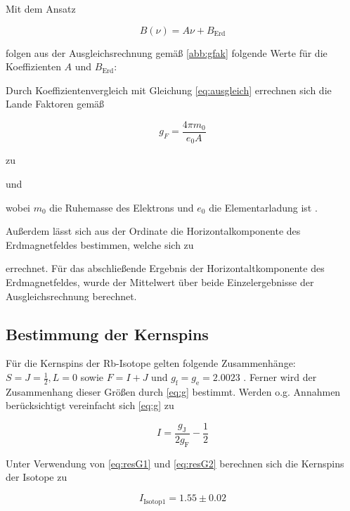 Mit dem Ansatz

\begin{equation}
B(\nu) = A\nu + B_\text{Erd}
\end{equation}

folgen aus der Ausgleichsrechnung gemäß \autoref{abb:gfak} folgende Werte für die Koeffizienten $A$ und $B_\text{Erd}$:



Durch Koeffizientenvergleich mit Gleichung \ref{eq:ausgleich} errechnen sich die Lande Faktoren gemäß

\begin{equation}
g_F = \frac{4\pi m_0}{e_0 A}
\end{equation}

zu



und



wobei $m_0$ die Ruhemasse des Elektrons und $e_0$ die Elementarladung ist \cite{elec}.

Außerdem lässt sich aus der Ordinate die Horizontalkomponente des Erdmagnetfeldes bestimmen,
welche sich zu



errechnet. Für das abschließende Ergebnis der Horizontaltkomponente des Erdmagnetfeldes, wurde der Mittelwert über beide Einzelergebnisse der Ausgleichsrechnung berechnet.

\subsection{Bestimmung der Kernspins}
Für die Kernspins der Rb-Isotope gelten folgende Zusammenhänge: $S = J = \frac{1}{2} , L = 0$ sowie $F = I + J$ und $g_\text{f} = g_\text{e} = 2.0023$ \cite{landeE-}. Ferner wird
der Zusammenhang dieser Größen durch \autoref{eq:g} bestimmt. Werden o.g. Annahmen berücksichtigt vereinfacht sich \autoref{eq:g} zu

\begin{equation}
    I = \frac{g_\text{J}}{2g_\text{F}} - \frac{1}{2}
\end{equation}

Unter Verwendung von \autoref{eq:resG1} und \autoref{eq:resG2} berechnen sich die Kernspins der Isotope zu

\begin{equation}
I_\text{Isotop1} = 1.55 \pm 0.02 
\label{eq:result1}
\end{equation}

